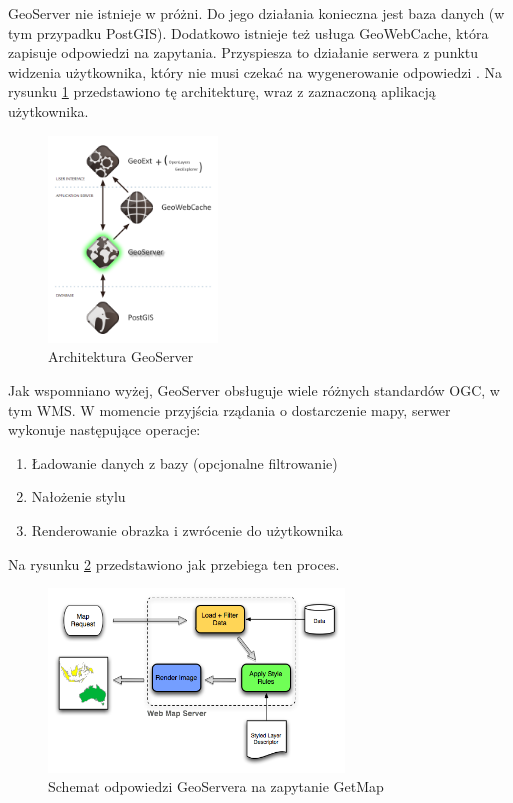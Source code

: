 GeoServer nie istnieje w próżni. Do jego działania konieczna jest baza danych (w tym przypadku PostGIS). Dodatkowo istnieje też usługa
GeoWebCache, która zapisuje odpowiedzi na zapytania. Przyspiesza to działanie serwera z punktu widzenia użytkownika, który nie musi
czekać na wygenerowanie odpowiedzi \cite{OpenGeo2012}. Na rysunku \ref{fig:GeoServerArchitecture} przedstawiono tę architekturę, wraz z zaznaczoną
aplikacją użytkownika.

\begin{figure}[h!]
    \centering
    \includegraphics[width=0.4\textwidth]{img/geoserver_architecture.png}
    \caption{Architektura GeoServer}
    \label{fig:GeoServerArchitecture}
\end{figure}

Jak wspomniano wyżej, GeoServer obsługuje wiele różnych standardów OGC, w tym WMS. W momencie przyjścia rządania o dostarczenie mapy,
serwer wykonuje następujące operacje:
\begin{enumerate}
    \item Ładowanie danych z bazy (opcjonalne filtrowanie)
    \item Nałożenie stylu
    \item Renderowanie obrazka i zwrócenie do użytkownika
\end{enumerate}
Na rysunku \ref{fig:geoserver_WMS_architecture} przedstawiono jak przebiega ten proces.

\begin{figure}[h!]
    \centering
    \includegraphics[width=0.7\textwidth]{img/geoserver_wms_architecture.png}
    \caption{Schemat odpowiedzi GeoServera na zapytanie GetMap}
    \label{fig:geoserver_WMS_architecture}
\end{figure}

